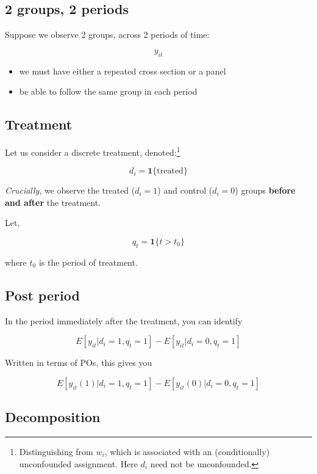 \documentclass[
  letterpaper,
  DIV=11,
  numbers=noendperiod]{scrartcl}
\begin{document}
\subsection{2 groups, 2 periods}\label{groups-2-periods}

Suppose we observe 2 groups, across 2 periods of time:

\[
  y_{it}
\]

\begin{itemize}
\item
  we must have either a repeated cross section or a panel
\item
  be able to follow the same group in each period
\end{itemize}

\subsection{Treatment}\label{treatment}

Let us consider a discrete treatment, denoted:\footnote{Distinguishing
  from \(w_i\), which is associated with an (conditionally) unconfounded
  assignment. Here \(d_i\) need not be unconfounded.}

\[
  d_i = \mathbf{1}\{\text{treated}\}
\]

\hfill\break

\emph{Crucially}, we observe the treated (\(d_i=1\)) and control
(\(d_i=0\)) groups \textbf{before and after} the treatment.

Let,

\[
  q_t = \mathbf{1}\{t>t_0\}
\]

where \(t_0\) is the period of treatment.

\subsection{Post period}\label{post-period}

In the period immediately after the treatment, you can identify

\[
  E[y_{it} | d_i =1, q_t = 1]-E[y_{it} | d_i =0, q_t = 1]
\]

Written in terms of POs, this gives you

\[
  E[y_{it}(1) | d_i =1, q_t = 1]-E[y_{it}(0) | d_i =0, q_t = 1]
\]

\subsection{Decomposition}\label{decomposition}
\end{document}
